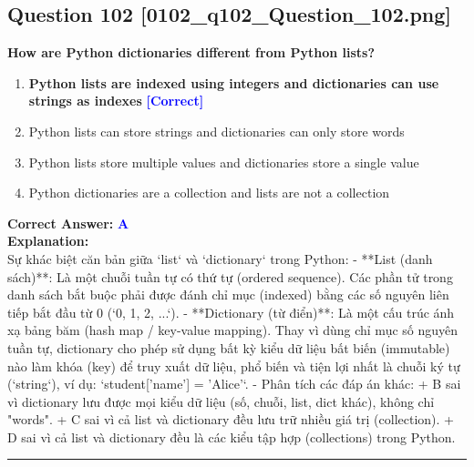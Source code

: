 \documentclass[11pt,a4paper]{article}
\begin{document}
\begin{minipage}{\textwidth}
\subsection*{Question 102 \quad \footnotesize{[0102_q102_Question_102.png]}}
\noindent \textbf{How are Python dictionaries different from Python lists?}

\begin{enumerate}[label=\Alph*.]
    \item \textbf{Python lists are indexed using integers and dictionaries can use strings as indexes} \hfill \textcolor{blue}{\textbf{[Correct]}}
    \item Python lists can store strings and dictionaries can only store words
    \item Python lists store multiple values and dictionaries store a single value
    \item Python dictionaries are a collection and lists are not a collection
\end{enumerate}

\noindent \textbf{Correct Answer:} \textcolor{blue}{\textbf{A}} \\[4pt]
\noindent \textbf{Explanation:}\\
Sự khác biệt căn bản giữa `list` và `dictionary` trong Python:\newline
- **List (danh sách)**: Là một chuỗi tuần tự có thứ tự (ordered sequence). Các phần tử trong danh sách bắt buộc phải được đánh chỉ mục (indexed) bằng các số nguyên liên tiếp bắt đầu từ 0 (`0, 1, 2, ...`).\newline
- **Dictionary (từ điển)**: Là một cấu trúc ánh xạ bảng băm (hash map / key-value mapping). Thay vì dùng chỉ mục số nguyên tuần tự, dictionary cho phép sử dụng bất kỳ kiểu dữ liệu bất biến (immutable) nào làm khóa (key) để truy xuất dữ liệu, phổ biến và tiện lợi nhất là chuỗi ký tự (`string`), ví dụ: `student['name'] = 'Alice'`.\newline
- Phân tích các đáp án khác:\newline
  + B sai vì dictionary lưu được mọi kiểu dữ liệu (số, chuỗi, list, dict khác), không chỉ "words".\newline
  + C sai vì cả list và dictionary đều lưu trữ nhiều giá trị (collection).\newline
  + D sai vì cả list và dictionary đều là các kiểu tập hợp (collections) trong Python.
\end{minipage}
\vspace{0.8cm}
\hrule
\vspace{0.5cm}
\end{document}

